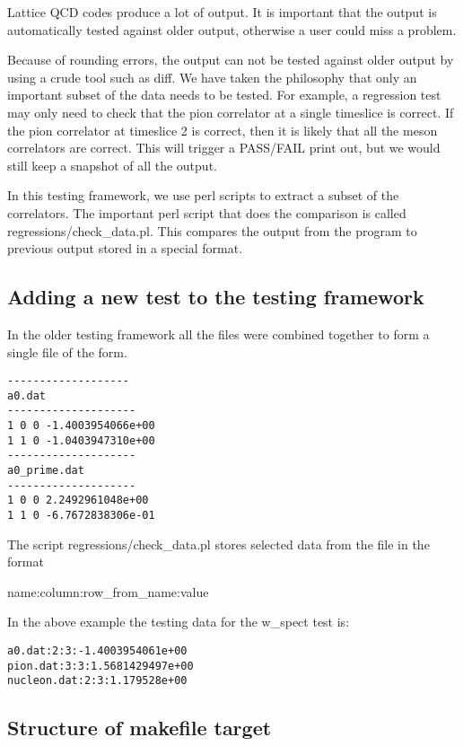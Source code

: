 \documentclass[12pt]{article}
\begin{document}
Lattice QCD codes produce a lot of output. It is important that the 
output is automatically tested against older output, otherwise
a user could miss a problem.

Because of rounding errors, the output can not be tested against older
output by using a crude tool such as diff. We have taken the
philosophy that only an important subset of the data needs to be
tested. For example, a regression test may only need to check that the
pion correlator at a single timeslice is correct. If the pion
correlator at timeslice 2 is correct, then it is likely that all the
meson correlators are correct. This will trigger a PASS/FAIL
print out, but we would still keep a snapshot of all the output.

In this testing framework, we use perl scripts to
extract a subset of the correlators. The important
perl script that does the comparison is called
regressions/check\_data.pl. This compares the output from
the program to previous output stored in a special format.

\subsection{Adding a new test to the testing framework}

In the older testing framework all the files were 
combined together to form a single file of the form.

\begin{verbatim}
-------------------
a0.dat
--------------------
1 0 0 -1.4003954066e+00
1 1 0 -1.0403947310e+00
--------------------
a0_prime.dat
--------------------
1 0 0 2.2492961048e+00
1 1 0 -6.7672838306e-01
\end{verbatim}

The script regressions/check\_data.pl stores selected data
from the file in the format
\begin{center}
name:column:row\_from\_name:value
\end{center}
In the above example the testing data for the w\_spect
test is:

\begin{verbatim}
a0.dat:2:3:-1.4003954061e+00
pion.dat:3:3:1.5681429497e+00
nucleon.dat:2:3:1.179528e+00
\end{verbatim}


\subsection{Structure of makefile target}
\end{document}
